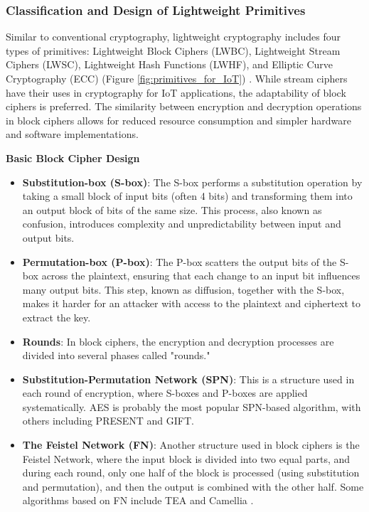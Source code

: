 \subsubsection{Classification and Design of Lightweight Primitives}
Similar to conventional cryptography, lightweight cryptography includes four types of primitives: Lightweight Block Ciphers (LWBC), Lightweight Stream Ciphers (LWSC), Lightweight Hash Functions (LWHF), and Elliptic Curve Cryptography (ECC) (Figure \ref{fig:primitives_for_IoT}) \cite{dhanda2020lightweight}. While stream ciphers have their uses in cryptography for IoT applications, the adaptability of block ciphers is preferred. The similarity between encryption and decryption operations in block ciphers allows for reduced resource consumption and simpler hardware and software implementations.

\textbf{Basic Block Cipher Design}
\begin{itemize}
    \item \textbf{Substitution-box (S-box)}: The S-box performs a substitution operation by taking a small block of input bits (often 4 bits) and transforming them into an output block of bits of the same size. This process, also known as confusion, introduces complexity and unpredictability between input and output bits.
    \item \textbf{Permutation-box (P-box)}: The P-box scatters the output bits of the S-box across the plaintext, ensuring that each change to an input bit influences many output bits. This step, known as diffusion, together with the S-box, makes it harder for an attacker with access to the plaintext and ciphertext to extract the key.
    \item \textbf{Rounds}: In block ciphers, the encryption and decryption processes are divided into several phases called "rounds."
    \item \textbf{Substitution-Permutation Network (SPN)}: This is a structure used in each round of encryption, where S-boxes and P-boxes are applied systematically. AES is probably the most popular SPN-based algorithm, with others including PRESENT and GIFT.
    \item \textbf{The Feistel Network (FN)}: Another structure used in block ciphers is the Feistel Network, where the input block is divided into two equal parts, and during each round, only one half of the block is processed (using substitution and permutation), and then the output is combined with the other half. Some algorithms based on FN include TEA and Camellia \cite{ekwueme2024lightweight} \cite{chauhan2022analysis}.
\end{itemize}


